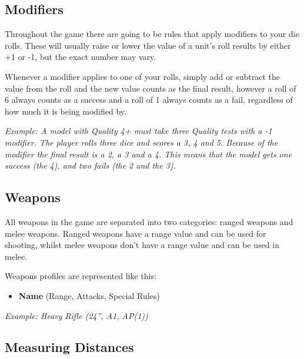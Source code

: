 \documentclass[9pt, a4paper, bookmarks=false]{extarticle}            %
\begin{document}
\newpage



\vspace*{0.2cm}

\begin{multicols*}{2}

\subsection{Modifiers}

Throughout the game there are going to be rules that apply modifiers to your die rolls. These will usually raise or lower the value of a unit’s roll results by either +1 or -1, but the exact number may vary.

Whenever a modifier applies to one of your rolls, simply add or subtract the value from the roll and the new value counts as the final result, however a roll of 6 always counts as a success and a roll of 1 always counts as a fail, regardless of how much it is being modified by.

\textit{Example: A model with Quality 4+ must take three Quality tests with a -1 modifier. The player rolls three dice and scores a 3, 4 and 5. Because of the modifier the final result is a 2, a 3 and a 4. This means that the model gets one success (the 4), and two fails (the 2 and the 3).}

\subsection{Weapons}

All weapons in the game are separated into two categories: ranged weapons and melee weapons. Ranged weapons have a range value and can be used for shooting, whilst melee weapons don’t have a range value and can be used in melee.

Weapons profiles are represented like this:
\begin{itemize}
  \item \textbf{Name} (Range, Attacks, Special Rules)
\end{itemize}

\textit{Example: Heavy Rifle (24”, A1, AP(1))}

\subsection{Measuring Distances}


\end{multicols*}
\end{document}
